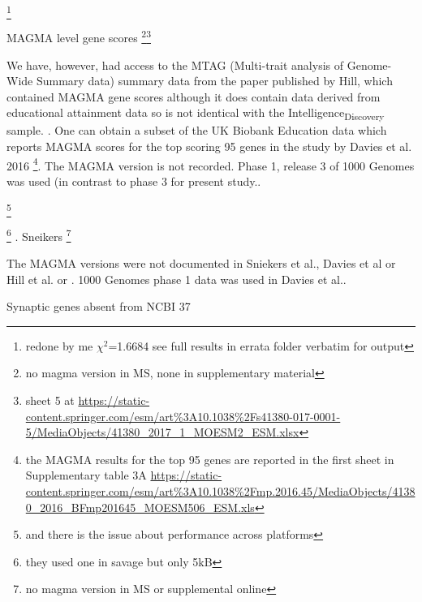 \footnote{redone by me  $\chi^2$=1.6684 see full results in errata folder verbatim for output}


MAGMA level gene scores
\footnote{no magma version in MS, none in supplementary material}\footnote{ sheet 5 at \url{https://static-content.springer.com/esm/art\%3A10.1038\%2Fs41380-017-0001-5/MediaObjects/41380_2017_1_MOESM2_ESM.xlsx}}



We have, however, had access to the MTAG (Multi-trait analysis of Genome-Wide Summary data) summary data from the paper published by Hill, which contained MAGMA gene scores although it does contain data derived from educational attainment data so is not identical with the Intelligence\textsubscript{Discovery} sample. \cite{hill2019combined}. One
can obtain a subset of the UK Biobank Education data which reports MAGMA scores for the top scoring 95 genes in the study by Davies et al. 2016 \cite{davies2016genome} \footnote{the MAGMA results for the top 95 genes are reported in the first sheet in Supplementary table 3A \url{https://static-content.springer.com/esm/art\%3A10.1038\%2Fmp.2016.45/MediaObjects/41380_2016_BFmp201645_MOESM506_ESM.xls}}. The MAGMA version is not recorded. Phase 1, release 3 of 1000 Genomes was used (in contrast to phase 3 for present study..


\footnote{and there is the issue about performance across platforms}


\footnote{they used one in savage but only 5kB}
. 
Sneikers \footnote{no magma version in MS or supplemental online} 

The MAGMA versions were not documented in Sniekers et al., Davies et al or Hill et al. \cite{davies2016genome} or \cite{sniekers2017genome} \cite{hill2019combined}. 1000 Genomes phase 1 data was used in Davies et al.\cite{davies2016genome}. 

Synaptic genes absent from NCBI 37

